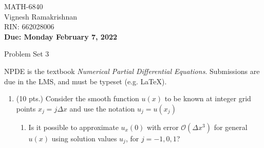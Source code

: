 \documentclass[11pt]{article}
\newcommand{\Oc}{\mathcal{O}}
\newcommand{\dx}{\Delta x}
\begin{document}
\begin{flushright}
\small{MATH-6840\\
Vignesh Ramakrishnan\\
RIN: 662028006\\
{\bf Due: Monday February 7, 2022}}
\end{flushright}

\begin{center}
\large{Problem Set 3}\\
\end{center}

NPDE is the textbook {\em Numerical Partial Differential Equations}. Submissions are due in the LMS, and must be typeset (e.g. \LaTeX).

\begin{enumerate}
  \item (10 pts.) {\color{red}Consider the smooth function} $u(x)$ {\color{red}to be known at integer grid points} $x_j=j\dx$ {\color{red}and use the notation} $u_j=u(x_j)$
  \begin{enumerate}
    \item {\color{blue}Is it possible to approximate} $u_{x}(0)$ {\color{blue}with error} $\Oc(\dx^3)${ \color{blue}for general} $u(x)$ {\color{blue}using solution values} $u_j$, {\color{blue}for} $j=-1,0,1${\color{blue}?}\\
    

\end{enumerate}
\end{enumerate}
\end{document}
